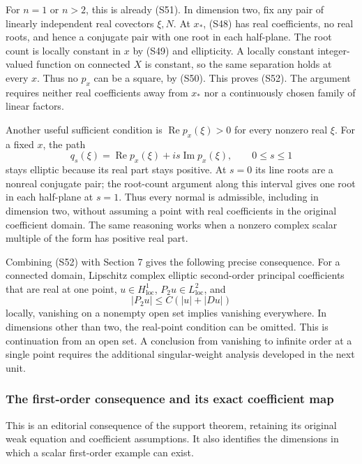 \documentclass[
  11pt,
]{article}
\begin{document}
For \(n=1\) or \(n>2\), this is already (S51). In dimension two, fix any
pair of linearly independent real covectors \(\xi,N\). At \(x_*\), (S48)
has real coefficients, no real roots, and hence a conjugate pair with
one root in each half-plane. The root count is locally constant in \(x\)
by (S49) and ellipticity. A locally constant integer-valued function on
connected \(X\) is constant, so the same separation holds at every
\(x\). Thus no \(p_x\) can be a square, by (S50). This proves (S52). The
argument requires neither real coefficients away from \(x_*\) nor a
continuously chosen family of linear factors.

Another useful sufficient condition is \(\operatorname{Re}p_x(\xi)>0\)
for every nonzero real \(\xi\). For a fixed \(x\), the path \[
 q_s(\xi)=\operatorname{Re}p_x(\xi)
                      +is\operatorname{Im}p_x(\xi),\qquad 0\leq s\leq1
\] stays elliptic because its real part stays positive. At \(s=0\) its
line roots are a nonreal conjugate pair; the root-count argument along
this interval gives one root in each half-plane at \(s=1\). Thus every
normal is admissible, including in dimension two, without assuming a
point with real coefficients in the original coefficient domain. The
same reasoning works when a nonzero complex scalar multiple of the form
has positive real part.

Combining (S52) with Section 7 gives the following precise consequence.
For a connected domain, Lipschitz complex elliptic second-order
principal coefficients that are real at one point,
\(u\in H^1_{\mathrm{loc}}\), \(P_2u\in L^2_{\mathrm{loc}}\), and \[
                    |P_2u|\leq C(|u|+|Du|)
\] locally, vanishing on a nonempty open set implies vanishing
everywhere. In dimensions other than two, the real-point condition can
be omitted. This is continuation from an open set. A conclusion from
vanishing to infinite order at a single point requires the additional
singular-weight analysis developed in the next unit.

\subsubsection{The first-order consequence and its exact coefficient
map}\label{the-first-order-consequence-and-its-exact-coefficient-map}

This is an editorial consequence of the support theorem, retaining its
original weak equation and coefficient assumptions. It also identifies
the dimensions in which a scalar first-order example can exist.
\end{document}
